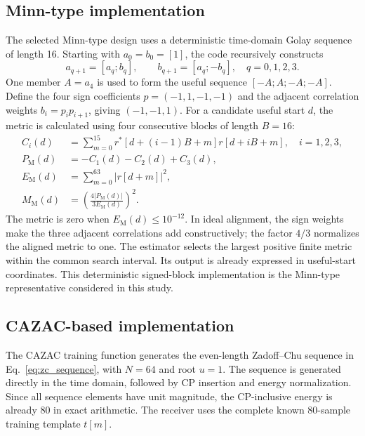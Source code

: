 \subsection{Minn-type implementation}
The selected Minn-type design uses a deterministic time-domain Golay sequence of length 16. Starting with $a_0=b_0=[1]$, the code recursively constructs
\begin{equation}
 a_{q+1}=[a_q;b_q],\qquad b_{q+1}=[a_q;-b_q],\quad q=0,1,2,3.
\end{equation}
One member $A=a_4$ is used to form the useful sequence $[-A;A;-A;-A]$. Define the four sign coefficients $p=(-1,1,-1,-1)$ and the adjacent correlation weights $b_i=p_i p_{i+1}$, giving $(-1,-1,1)$. For a candidate useful start $d$, the metric is calculated using four consecutive blocks of length $B=16$:
\begin{align}
 C_i(d)&=\sum_{m=0}^{15}r^*[d+(i-1)B+m]r[d+iB+m],\quad i=1,2,3,\\
 P_{\mathrm{M}}(d)&=-C_1(d)-C_2(d)+C_3(d),\\
 E_{\mathrm{M}}(d)&=\sum_{m=0}^{63}|r[d+m]|^2,\\
 M_{\mathrm{M}}(d)&=\left(\frac{4|P_{\mathrm{M}}(d)|}{3E_{\mathrm{M}}(d)}\right)^2.
\end{align}
The metric is zero when $E_{\mathrm{M}}(d)\leq10^{-12}$. In ideal alignment, the sign weights make the three adjacent correlations add constructively; the factor $4/3$ normalizes the aligned metric to one. The estimator selects the largest positive finite metric within the common search interval. Its output is already expressed in useful-start coordinates. This deterministic signed-block implementation is the Minn-type representative considered in this study.

\subsection{CAZAC-based implementation}
The CAZAC training function generates the even-length Zadoff--Chu sequence in Eq.~\eqref{eq:zc_sequence}, with $N=64$ and root $u=1$. The sequence is generated directly in the time domain, followed by CP insertion and energy normalization. Since all sequence elements have unit magnitude, the CP-inclusive energy is already 80 in exact arithmetic. The receiver uses the complete known 80-sample training template $t[m]$.

